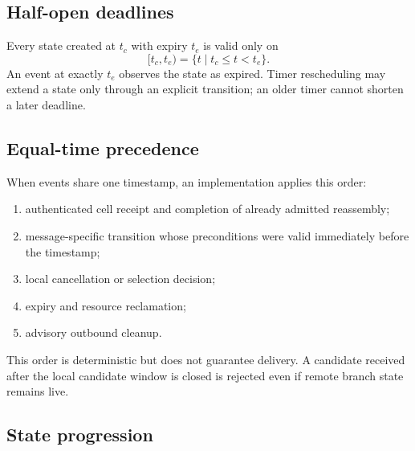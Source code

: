 \documentclass[11pt,oneside]{article}
\begin{document}
\subsection{Half-open deadlines}

Every state created at $t_c$ with expiry $t_e$ is valid only on
\begin{equation}
[t_c,t_e)=\{t\mid t_c\le t<t_e\}.
\end{equation}
An event at exactly $t_e$ observes the state as expired. Timer rescheduling may extend a state only through an explicit transition; an older timer cannot shorten a later deadline.

\subsection{Equal-time precedence}

When events share one timestamp, an implementation applies this order:

\begin{enumerate}
  \item authenticated cell receipt and completion of already admitted reassembly;
  \item message-specific transition whose preconditions were valid immediately before the timestamp;
  \item local cancellation or selection decision;
  \item expiry and resource reclamation;
  \item advisory outbound cleanup.
\end{enumerate}

This order is deterministic but does not guarantee delivery. A candidate received after the local candidate window is closed is rejected even if remote branch state remains live.

\subsection{State progression}
\end{document}
